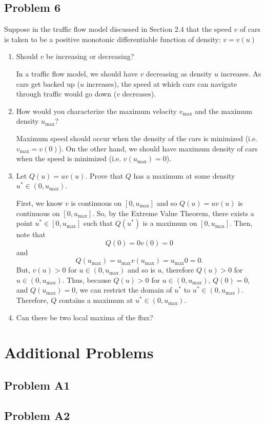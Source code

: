 \documentclass[a4paper,12pt]{article}
\begin{document}
\subsection*{Problem 6}
	Suppose in the traffic flow model discussed in Section 2.4 that the speed $ v $ of cars is taken to be a positive monotonic differentiable function of density: $ v = v(u) $
	\begin{enumerate}[label = \textbf{(\alph*)}]
		\item Should $ v $ be increasing or decreasing?
		
		In a traffic flow model, we should have $ v $ decreasing as density $ u $ increases. As cars get backed up ($ u $ increases), the speed at which cars can navigate through traffic would go down ($ v $ decreases).
		
		\item How would you characterize the maximum velocity $ v_\text{max} $ and the maximum density $ u_\text{max} $?
		
		Maximum speed should occur when the density of the cars is minimized (i.e. $ v_{\text{max}} = v(0) $). On the other hand, we should have maximum density of cars when the speed is minimized (i.e. $ v(u_\text{max}) = 0 $).
		
		\item Let $ Q(u) = u v(u) $. Prove that $ Q $ has a maximum at some density $ u^* \in (0,u_\text{max})$.
		
		First, we know $ v $ is continuous on $ [0, u_\text{max}] $ and so $ Q(u) = u v(u) $ is continuous on $ [0, u_\text{max}] $. So, by the Extreme Value Theorem, there exists a point $ u^* \in [0,u_\text{max}] $ such that $ Q(u^*) $ is a maximum on $ [0, u_\text{max}] $. Then, note that 
		\[
			Q(0) = 0 v(0) = 0
		\]
		and
		\[
			Q(u_\text{max})  = u_\text{max} v(u_\text{max}) = u_\text{max} 0 = 0.
		\]
		 But, $ v(u) > 0$ for $ u \in (0, u_\text{max}) $ and so is $ u $, therefore $ Q(u) > 0 $ for $ u \in (0, u_\text{max}) $. Thus, because $ Q(u) > 0 $ for $u \in (0, u_\text{max})$, $ Q(0) = 0 $, and $ Q(u_\text{max}) = 0 $, we can restrict the domain of $ u^* $ to $ u^* \in (0, u_\text{max}) $. Therefore, $ Q $ contains a maximum at $u^* \in (0, u_\text{max})$.
		
		\item Can there be two local maxima of the flux?
	\end{enumerate}

\section*{Additional Problems}
\subsection*{Problem A1}

\subsection*{Problem A2}
\end{document}

